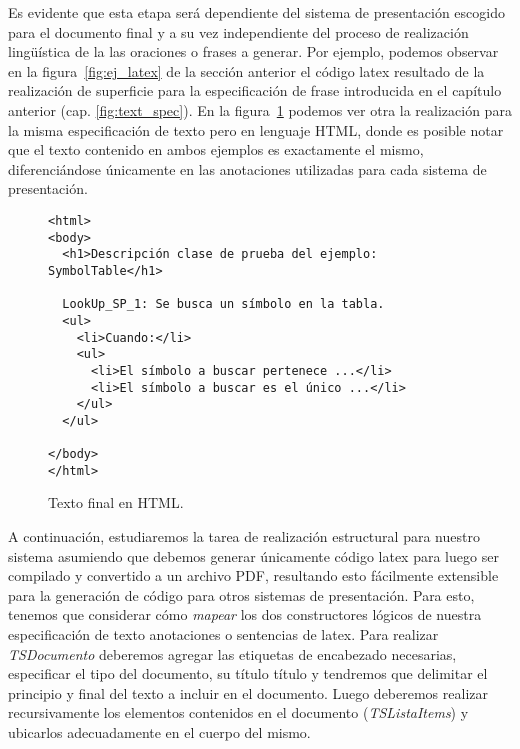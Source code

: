 Es evidente que esta etapa será dependiente del sistema de presentación escogido para el documento final y a su vez independiente del proceso de realización lingüística de la las oraciones o frases a generar.  Por ejemplo, podemos observar en la figura~\ref{fig:ej_latex} de la sección anterior el código latex resultado de la realización de superficie para la especificación de frase introducida en el capítulo anterior (cap. \ref{fig:text_spec}). En la figura~\ref{fig:ej_html} podemos ver otra la realización para la misma especificación de texto pero en lenguaje HTML, donde es posible notar que el texto contenido en ambos ejemplos es exactamente el mismo, diferenciándose únicamente en las anotaciones utilizadas para cada sistema de presentación.

\begin{figure}[H]
  \begin{verbatim}
<html>
<body>
  <h1>Descripción clase de prueba del ejemplo: SymbolTable</h1>

  LookUp_SP_1: Se busca un símbolo en la tabla.  
  <ul>
    <li>Cuando:</li>
    <ul>
      <li>El símbolo a buscar pertenece ...</li>
      <li>El símbolo a buscar es el único ...</li>
    </ul>
  </ul>

</body>
</html>
  \end{verbatim}
  \caption{Texto final en HTML.}
  \label{fig:ej_html}
\end{figure}


A continuación, estudiaremos la tarea de realización estructural para nuestro sistema asumiendo que debemos generar únicamente código latex para luego ser compilado y convertido a un archivo PDF, resultando esto fácilmente extensible para la generación de código para otros sistemas de presentación. Para esto, tenemos que considerar cómo \emph{mapear} los dos constructores lógicos de nuestra especificación de texto anotaciones o sentencias de latex. Para realizar \emph{TSDocumento} deberemos agregar las etiquetas de encabezado necesarias, especificar el tipo del documento, su título título y tendremos que delimitar el principio y final del texto a incluir en el documento. Luego deberemos realizar recursivamente los elementos contenidos en el documento (\emph{TSListaItems}) y ubicarlos adecuadamente en el cuerpo del mismo.

